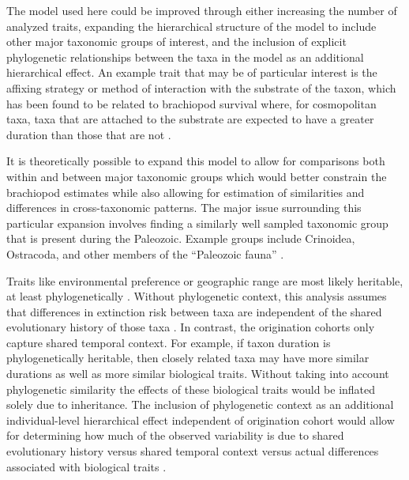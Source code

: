 \documentclass{article}
\begin{document}
The model used here could be improved through either increasing the number of analyzed traits, expanding the hierarchical structure of the model to include other major taxonomic groups of interest, and the inclusion of explicit phylogenetic relationships between the taxa in the model as an additional hierarchical effect. An example trait that may be of particular interest is the affixing strategy or method of interaction with the substrate of the taxon, which has been found to be related to brachiopod survival where, for cosmopolitan taxa, taxa that are attached to the substrate are expected to have a greater duration than those that are not \citep{Alexander1977}.

It is theoretically possible to expand this model to allow for comparisons both within and between major taxonomic groups which would better constrain the brachiopod estimates while also allowing for estimation of similarities and differences in cross-taxonomic patterns. The major issue surrounding this particular expansion involves finding a similarly well sampled taxonomic group that is present during the Paleozoic. Example groups include Crinoidea, Ostracoda, and other members of the ``Paleozoic fauna'' \citep{Sepkoski1981a}.

Traits like environmental preference or geographic range \citep{Jablonski1987,Hunt2005b} are most likely heritable, at least phylogenetically \citep{Lynch1991,Housworth2004}. Without phylogenetic context, this analysis assumes that differences in extinction risk between taxa are independent of the shared evolutionary history of those  taxa \citep{Felsenstein1985b}. In contrast, the origination cohorts only capture shared temporal context. For example, if taxon duration is phylogenetically heritable, then closely related taxa may have more similar durations as well as more similar biological traits. Without taking into account phylogenetic similarity the effects of these biological traits would be inflated solely due to inheritance. The inclusion of phylogenetic context as an additional individual-level hierarchical effect independent of origination cohort would allow for determining how much of the observed variability is due to shared evolutionary history versus shared temporal context versus actual differences associated with biological traits \citep{Harnik2014,Smits2015}. 
\end{document}
